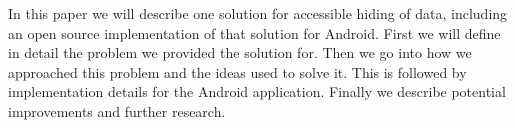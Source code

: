 In this paper we will describe one solution for accessible hiding of data, including an open source implementation of that solution for Android.
First we will define in detail the problem we provided the solution for.
Then we go into how we approached this problem and the ideas used to solve it.
This is followed by implementation details for the Android application.
Finally we describe potential improvements and further research.